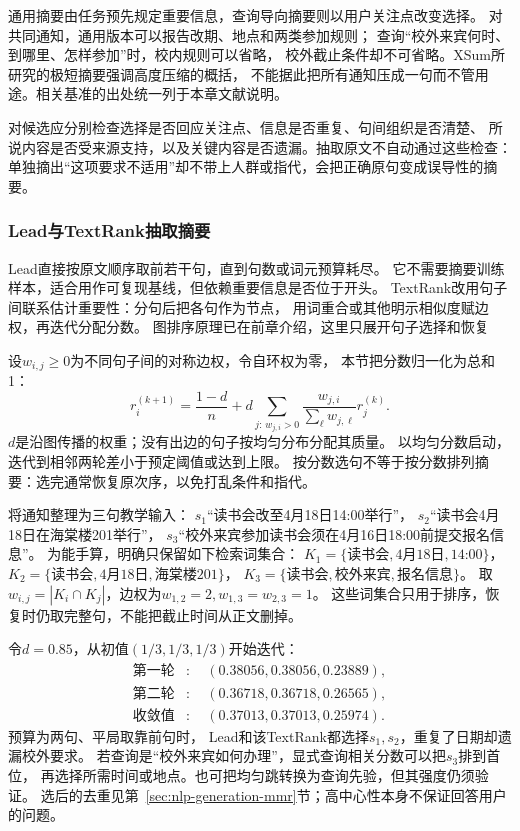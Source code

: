 通用摘要由任务预先规定重要信息，查询导向摘要则以用户关注点改变选择。
对共同通知，通用版本可以报告改期、地点和两类参加规则；
查询“校外来宾何时、到哪里、怎样参加”时，校内规则可以省略，
校外截止条件却不可省略。XSum所研究的极短摘要强调高度压缩的概括，
不能据此把所有通知压成一句而不管用途。相关基准的出处统一列于本章文献说明。

对候选应分别检查选择是否回应关注点、信息是否重复、句间组织是否清楚、
所说内容是否受来源支持，以及关键内容是否遗漏。抽取原文不自动通过这些检查：
单独摘出“这项要求不适用”却不带上人群或指代，会把正确原句变成误导性的摘要。

\subsubsection{Lead与TextRank抽取摘要}
\label{sec:nlp-generation-extractive}

Lead直接按原文顺序取前若干句，直到句数或词元预算耗尽。
它不需要摘要训练样本，适合用作可复现基线，但依赖重要信息是否位于开头。
TextRank改用句子间联系估计重要性：分句后把各句作为节点，
用词重合或其他明示相似度赋边权，再迭代分配分数。
图排序原理已在前章介绍，这里只展开句子选择和恢复

设$w_{i,j}\geq0$为不同句子间的对称边权，令自环权为零，
本节把分数归一化为总和1：
\begin{equation}
  r_i^{(k+1)}
  =\frac{1-d}{n}
   +d\sum_{j:\,w_{j,i}>0}
   \frac{w_{j,i}}{\sum_\ell w_{j,\ell}}r_j^{(k)}.
  \label{eq:nlp-generation-textrank}
\end{equation}
$d$是沿图传播的权重；没有出边的句子按均匀分布分配其质量。
以均匀分数启动，迭代到相邻两轮差小于预定阈值或达到上限。
按分数选句不等于按分数排列摘要：选完通常恢复原次序，以免打乱条件和指代。

将通知整理为三句教学输入：
$s_1$“读书会改至4月18日14:00举行”，
$s_2$“读书会4月18日在海棠楼201举行”，
$s_3$“校外来宾参加读书会须在4月16日18:00前提交报名信息”。
为能手算，明确只保留如下检索词集合：
$K_1=\{\text{读书会},\text{4月18日},\text{14:00}\}$，
$K_2=\{\text{读书会},\text{4月18日},\text{海棠楼201}\}$，
$K_3=\{\text{读书会},\text{校外来宾},\text{报名信息}\}$。
取$w_{i,j}=|K_i\cap K_j|$，边权为$w_{1,2}=2,w_{1,3}=w_{2,3}=1$。
这些词集合只用于排序，恢复时仍取完整句，不能把截止时间从正文删掉。

令$d=0.85$，从初值$(1/3,1/3,1/3)$开始迭代：
\[
  \begin{aligned}
    \text{第一轮}&:\quad(0.38056,0.38056,0.23889),\\
    \text{第二轮}&:\quad(0.36718,0.36718,0.26565),\\
    \text{收敛值}&:\quad(0.37013,0.37013,0.25974).
  \end{aligned}
\]
预算为两句、平局取靠前句时，
Lead和该TextRank都选择$s_1,s_2$，重复了日期却遗漏校外要求。
若查询是“校外来宾如何办理”，显式查询相关分数可以把$s_3$排到首位，
再选择所需时间或地点。也可把均匀跳转换为查询先验，但其强度仍须验证。
选后的去重见第~\ref{sec:nlp-generation-mmr}节；高中心性本身不保证回答用户的问题。

